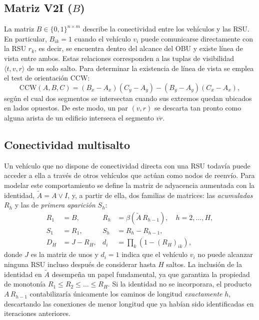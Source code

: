 \documentclass[smartcities,article,submit,oneauthor]{Definitions/mdpi}
\newcommand{\Atil}{\tilde{A}}
\newcommand{\bin}[1]{\beta\!\left(#1\right)}
\begin{document}
\subsection{Matriz V2I ($B$)}
La matriz $B\in\{0,1\}^{n\times m}$ describe la conectividad entre los vehículos y
las RSU. En particular, $B_{ik}=1$ cuando el vehículo $v_i$ puede comunicarse
directamente con la RSU $r_k$, es decir, se encuentra dentro del alcance del OBU y
existe línea de vista entre ambos. Estas relaciones corresponden a las tuplas de
visibilidad $\langle t, v, r\rangle$ de un solo salto. Para determinar la existencia
de línea de vista se emplea el test de orientación CCW:
\begin{equation}
\mathrm{CCW}(A,B,C) = (B_x-A_x)(C_y-A_y) - (B_y-A_y)(C_x-A_x),
\end{equation}
según el cual dos segmentos se intersectan cuando sus extremos quedan ubicados en
lados opuestos. De este modo, un par $(v,r)$ se descarta tan pronto como alguna
arista de un edificio interseca el segmento $\overline{v r}$.

\subsection{Conectividad multisalto}
Un vehículo que no dispone de conectividad directa con una RSU todavía puede acceder
a ella a través de otros vehículos que actúan como nodos de reenvío. Para modelar
este comportamiento se define la matriz de adyacencia aumentada con la identidad,
$\Atil = A \vee I$, y, a partir de ella, dos familias de matrices: las
\emph{acumuladas} $R_h$ y las de \emph{primera aparición} $S_h$:
\begin{align}
R_1 &= B, & R_h &= \bin{\Atil \, R_{h-1}}, \quad h=2,\dots,H, \label{eq:Rh}\\
S_1 &= R_1, & S_h &= R_h - R_{h-1}, \label{eq:Sh}\\
D_H &= J - R_H, & d_i &= \textstyle\prod_{k}\left(1-(R_H)_{ik}\right), \label{eq:DH}
\end{align}
donde $J$ es la matriz de unos y $d_i=1$ indica que el vehículo $v_i$ no puede
alcanzar ninguna RSU incluso después de considerar hasta $H$ saltos. La inclusión de
la identidad en $\Atil$ desempeña un papel fundamental, ya que garantiza la propiedad
de monotonía $R_1 \le R_2 \le \dots \le R_H$. Si la identidad no se incorporara, el
producto $A\,R_{h-1}$ contabilizaría únicamente los caminos de longitud
\emph{exactamente} $h$, descartando las conexiones de menor longitud que ya habían
sido identificadas en iteraciones anteriores.
\end{document}
